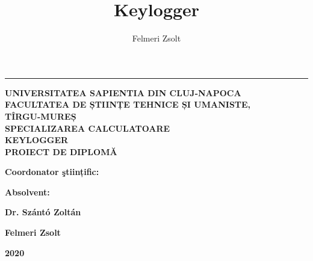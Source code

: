 \documentclass[a4paper, 11pt]{article}
\title{Keylogger}
\author{Felmeri Zsolt}
\date{}
\begin{document}
 
\begin{titlepage}
\rule[20pt]{\textwidth}{1pt}
\begin{centering}
\vspace{4pt}
{\fontsize{18pt}{1} \textbf{UNIVERSITATEA SAPIENTIA DIN CLUJ-NAPOCA}}\\ \vspace{4pt}
{\fontsize{16pt}{1} \textbf{FACULTATEA DE ȘTIINȚE TEHNICE ȘI UMANISTE,\\
TÎRGU-MUREȘ\\
SPECIALIZAREA CALCULATOARE}}\\
\vspace{10em}
{\fontsize{28pt}{1} \textbf{KEYLOGGER}} \\
\vspace{10em}
{\fontsize{24pt}{1} \textbf{PROIECT DE DIPLOMĂ}}\\
\end{centering}

\vspace{15em}
\begin{noindent}
{\fontsize{16pt}{1} \textbf{Coordonator ştiințific:}}
\begin{hfill}
{\fontsize{16pt}{1} \textbf{Absolvent:}}
\end{hfill}
\end{noindent}

\begin{noindent}
\hspace{2.5em}
{\fontsize{14pt}{1} \textbf{Dr. Szántó Zoltán}}
\begin{hfill}
{\fontsize{14pt}{1} \textbf{Felmeri Zsolt}}
\end{hfill}
\end{noindent}

\vspace{5em}
\centering
{\fontsize{28pt}{1} \textbf{2020}}
\end{titlepage}
\end{document}
